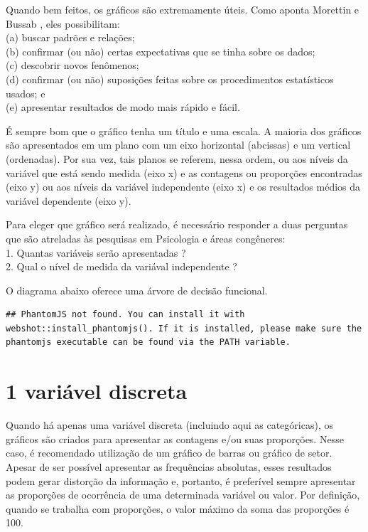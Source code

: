 \documentclass[
]{book}
\begin{document}
Quando bem feitos, os gráficos são extremamente úteis. Como aponta Morettin e Bussab \citep{morettin_bussab_2010}, eles possibilitam:\\
(a) buscar padrões e relações;\\
(b) confirmar (ou não) certas expectativas que se tinha sobre os dados;\\
(c) descobrir novos fenômenos;\\
(d) confirmar (ou não) suposições feitas sobre os procedimentos estatísticos usados; e\\
(e) apresentar resultados de modo mais rápido e fácil.

É sempre bom que o gráfico tenha um título e uma escala. A maioria dos gráficos são apresentados em um plano com um eixo horizontal (abcissas) e um vertical (ordenadas). Por sua vez, tais planos se referem, nessa ordem, ou aos níveis da variável que está sendo medida (eixo x) e as contagens ou proporções encontradas (eixo y) ou aos níveis da variável independente (eixo x) e os resultados médios da variável dependente (eixo y).

Para eleger que gráfico será realizado, é necessário responder a duas perguntas que são atreladas às pesquisas em Psicologia e áreas congêneres:\\
1. Quantas variáveis serão apresentadas ?\\
2. Qual o nível de medida da variával independente ?

O diagrama abaixo oferece uma árvore de decisão funcional.

\begin{verbatim}
## PhantomJS not found. You can install it with webshot::install_phantomjs(). If it is installed, please make sure the phantomjs executable can be found via the PATH variable.
\end{verbatim}

\hypertarget{htmlwidget-8765dcbeed66bacca0a7}{}
\begin{grViz}

\end{grViz}

\hypertarget{variuxe1vel-discreta}{%
\section{1 variável discreta}\label{variuxe1vel-discreta}}

Quando há apenas uma variável discreta (incluindo aqui as categóricas), os gráficos são criados para apresentar as contagens e/ou suas proporções. Nesse caso, é recomendado utilização de um gráfico de barras ou gráfico de setor. Apesar de ser possível apresentar as frequências absolutas, esses resultados podem gerar distorção da informação e, portanto, é preferível sempre apresentar as proporções de ocorrência de uma determinada variável ou valor. Por definição, quando se trabalha com proporções, o valor máximo da soma das proporções é 100.
\end{document}
